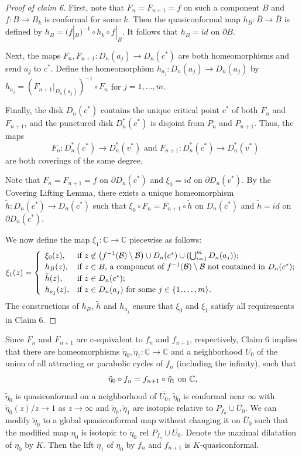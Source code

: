 \documentclass[a4paper,reqno,times, 11pt]{amsart}
\theoremstyle{remark}
\theoremstyle{plain}
\numberwithin{equation}{section}
\def\t{\tilde}
\def\C{\mbox{$\mathbb C$}}
\begin{document}
\begin{proof}[Proof of claim 6]
			First, note that $F_n=F_{n+1}=f$ on such a component $B$
			and $f:B\to B_k$ is conformal for some $k$. Then the quasiconformal map $h_B: \overline{B}\to \overline{B}$ is defined by $h_B=(f|_B)^{-1}\circ h_k\circ f|_B$. It follows that $h_B=id$ on $\partial B$.
			
			Next, the maps $F_n,F_{n+1}:D_n(a_j)\to D_n(c^*)$ are both homeomorphisms and send $a_j$ to $c^*$. Define the homeomorphism $h_{a_j}:D_n(a_j)\to D_n(a_j)$ by $h_{a_j}=(F_{n+1}|_{D_n(a_j)})^{-1}\circ F_n$ for $j=1,\ldots, m$.
			
			Finally, the disk $D_n(c^*)$ contains the unique critical point $c^*$ of both $F_n$ and $F_{n+1}$, and the punctured disk $D^*_n(c^*)$ is disjoint from $P_n$ and $P_{n+1}$. Thus, the maps
			\[\text{ $F_n:D^*_n(c^*)\to D^*_n(v^*)$  and $F_{n+1}:D^*_n(c^*)\to D^*_n(v^*)$}\]
			are both coverings of the same degree.
			
			Note that $F_n=F_{n+1}=f$ on $\partial D_n(c^*)$ and $\xi_0=id$ on $\partial D_n(v^*)$. By the Covering Lifting Lemma, there exists a unique homeomorphism $\tilde{h}:\overline{D_n(c^*)}\to \overline{D_n(c^*)}$ such that $\xi_0\circ F_n=F_{n+1}\circ \tilde{h}$ on $\overline{D_n(c^*)}$ and $\tilde{h}=id$ on $\partial D_n(c^*)$.
			
			We now define the map $\xi_1:\C\to\C$ piecewise as follows:
			\[\xi_1(z)=\left\{
			\begin{array}{ll}
				\xi_0(z), & \hbox{if $z\not\in\left( f^{-1}(\mathcal{B})\setminus\mathcal{B}\right)\cup D_n(c^*)\cup(\bigcup_{i=1}^m D_n(a_j))$;} \\[2pt]
				h_B(z), & \hbox{if $z\in B$, a component of $f^{-1}(\mathcal{B})\setminus\mathcal{B}$ not contained in $D_n(c^*)$;}\\[2pt]
				\tilde{h}(z), &\hbox{if $z\in D_n(c^*)$;}\\[2pt]
				h_{a_j}(z), &\hbox{if $z\in D_n(a_j)$ for some $j\in\{1,\ldots,m\}$.}
				
			\end{array}
			\right.\]
			The constructions of $h_B$, $\tilde{h}$ and $h_{a_j}$ ensure that $\xi_0$ and $\xi_1$ satisfy all requirements in Claim 6.
		\end{proof}
		
		Since $F_n$ and $F_{n+1}$ are c-equivalent to $f_n$ and $f_{n+1}$, respectively, Claim 6 implies that there are homeomorphisms $\t{\eta}_0,\t{\eta}_1:\C\to\C$ and a neighborhood $U_0$ of the union of all attracting or parabolic cycles of $f_n$ (including the infinity), such that  $$\t{\eta}_0\circ f_n=f_{n+1}\circ \t{\eta}_1\textup{ on }\C,$$ $\t{\eta}_0$ is quasiconformal on a neighborhood of $\overline{U_0}$, $\t{\eta}_0$ is conformal near $\infty$ with $\t{\eta}_0(z)/z\to 1$ as $z\to\infty$ and $\t{\eta}_0,\t{\eta}_1$ are isotopic relative to $P_{f_n}\cup \overline{U_0}$. We can modify $\t{\eta}_0$ to a global quasiconformal map  without changing it on $\overline{U}_0$ such that the modified map $\eta_0$ is isotopic to $\t{\eta}_0$ rel $P_{f_n}\cup \overline{U_0}$. Denote the maximal dilatation of $\eta_0$ by $K$. Then the lift $\eta_1$ of $\eta_0$ by $f_n$ and $f_{n+1}$ is $K$-quasiconformal.
		 
\end{document}
